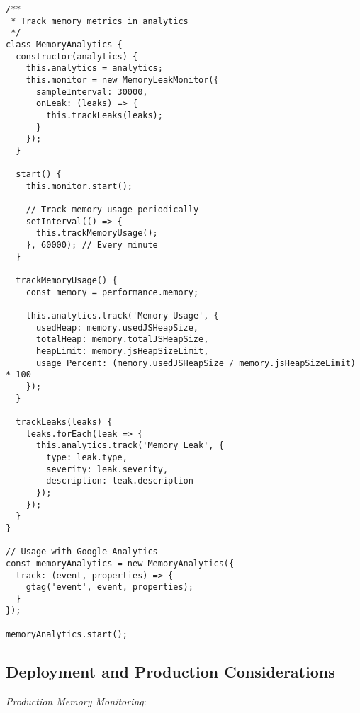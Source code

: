\documentclass[11pt]{article}
\begin{document}
\begin{verbatim}
/**
 * Track memory metrics in analytics
 */
class MemoryAnalytics {
  constructor(analytics) {
    this.analytics = analytics;
    this.monitor = new MemoryLeakMonitor({
      sampleInterval: 30000,
      onLeak: (leaks) => {
        this.trackLeaks(leaks);
      }
    });
  }
  
  start() {
    this.monitor.start();
    
    // Track memory usage periodically
    setInterval(() => {
      this.trackMemoryUsage();
    }, 60000); // Every minute
  }
  
  trackMemoryUsage() {
    const memory = performance.memory;
    
    this.analytics.track('Memory Usage', {
      usedHeap: memory.usedJSHeapSize,
      totalHeap: memory.totalJSHeapSize,
      heapLimit: memory.jsHeapSizeLimit,
      usage Percent: (memory.usedJSHeapSize / memory.jsHeapSizeLimit) * 100
    });
  }
  
  trackLeaks(leaks) {
    leaks.forEach(leak => {
      this.analytics.track('Memory Leak', {
        type: leak.type,
        severity: leak.severity,
        description: leak.description
      });
    });
  }
}

// Usage with Google Analytics
const memoryAnalytics = new MemoryAnalytics({
  track: (event, properties) => {
    gtag('event', event, properties);
  }
});

memoryAnalytics.start();
\end{verbatim}
\subsection{Deployment and Production Considerations}
\label{sec:orgcc0a54b}

\emph{Production Memory Monitoring}:
\end{document}
